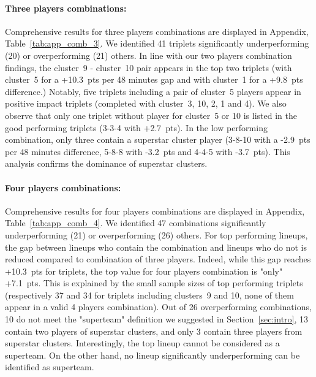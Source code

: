 \paragraph{Three players combinations:}
Comprehensive results for three players combinations are displayed in Appendix, Table~\ref{tab:app_comb_3}.
We identified 41 triplets significantly underperforming (20) or overperforming (21) others.
In line with our two players combination findings, the cluster~9 - cluster~10 pair appears in the top two triplets (with cluster~5 for a +10.3~pts per 48 minutes gap and with cluster~1 for a +9.8~pts difference.)
Notably, five triplets including a pair of cluster~5 players appear in positive impact triplets (completed with cluster~3, 10, 2, 1 and 4).
We also observe that only one triplet without player for cluster~5 or 10 is listed in the good performing triplets (3-3-4 with +2.7~pts). 
In the low performing combination, only three contain a superstar cluster player (3-8-10 with a -2.9~pts per 48 minutes difference, 5-8-8 with -3.2~pts and 4-4-5 with -3.7~pts).
This analysis confirms the dominance of superstar clusters.

\paragraph{Four players combinations:}
Comprehensive results for four players combinations are displayed in Appendix, Table~\ref{tab:app_comb_4}.
We identified 47 combinations significantly underperforming (21) or overperforming (26) others.
For top performing lineups, the gap between lineups who contain the combination and lineups who do not is reduced compared to combination of three players.
Indeed, while this gap reaches +10.3~pts for triplets, the top value for four players combination is "only" +7.1~pts.  
This is explained by the small sample sizes of top performing triplets (respectively 37 and 34 for triplets including clusters~9 and 10, none of them appear in a valid 4 players combination). 
Out of 26 overperforming combinations, 10 do not meet the "superteam" definition we suggested in Section~\ref{sec:intro}, 13 contain two players of superstar clusters, and only 3 contain three players from superstar clusters.
Interestingly, the top lineup cannot be considered as a superteam.
On the other hand, no lineup significantly underperforming can be identified as superteam.


